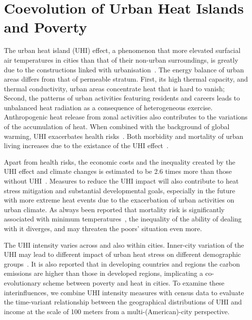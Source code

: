 \chapter{Coevolution of Urban Heat Islands and Poverty}

The urban heat island (UHI) effect, a phenomenon that more elevated surfacial air temperatures in cities than that of their non-urban surroundings, is greatly due to the constructions linked with urbanisation~\cite{Yunfei2020On,Chapman2017The,zhao2014strong,Peng2012Surface}. The energy balance of urban areas differs from that of permeable stratum. First, its high thermal capacity, and thermal conductivity, urban areas concentrate heat that is hard to vanish; Second, the patterns of urban activities featuring residents and careers leads to unbalanced heat radiation as a consequence of heterogeneous exercise. Anthropogenic heat release from zonal activities also contributes to the variations of the accumulation of heat. When combined with the background of global warming, UHI exacerbates health risks~\cite{milan2015reducing}. Both morbidity and mortality of urban living increases due to the existance of the UHI effect~\cite{tan2010the,stone2015}.

Apart from health risks, the economic costs and the inequality created by the UHI effect and climate changes is estimated to be 2.6 times more than those without UHI~\cite{estrada2017a}. Measures to reduce the UHI impact will also contribute to heat stress mitigation and substantial developmental goals, especially in the future with more extreme heat events due to the exacerbation of urban activities on urban climate. As always been reported that mortality risk is significantly associated with minimum temperatures~\cite{kalkstein1989weather}, the inequality of the ability of dealing with it diverges, and may threaten the poors' situation even more.

The UHI intensity varies across and also within cities. Inner-city variation of the UHI may lead to different impact of urban heat stress on different demographic groups~\cite{chakraborty2019disproportionately}. It is also reported that in developing countries and regions the carbon emissions are higher than those in developed regions, implicating a co-evolutionary scheme between poverty and heat in cities. To examine these interinfluences, we combine UHI intensity measures with census data to evaluate the time-variant relationship between the geographical distributions of UHI and income at the scale of 100 meters from a multi-(American)-city perspective.

